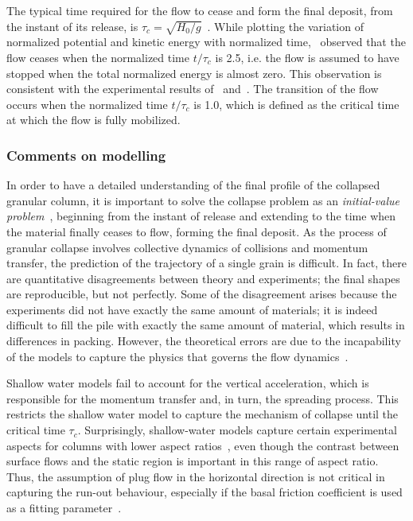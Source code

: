The typical time required for the flow to cease and form the final 
deposit, from the instant of its release, is 
$\tau_c=\sqrt{\textit{H}_{\textit{0}}/\textit{g}}$~\citep{Staron2007a}. 
While plotting the variation of normalized potential and kinetic energy with 
normalized time,~\citet{Staron2007a} observed that the flow ceases when the 
normalized time $\textit{t}/\tau_c$ is 2.5, i.e. the flow is assumed to 
have stopped when the total normalized energy is almost zero. This observation 
is consistent with the experimental results of~\citet{Lube2005} 
and~\citet{Lajeunesse2005}. The transition of the flow occurs when the 
normalized time $\textit{t}/\tau_c$ is 1.0, which is defined as the critical 
time at which the flow is fully mobilized.

\subsubsection{Comments on modelling}

In order to have a detailed understanding of the final profile of the collapsed 
granular column, it is important to solve the collapse problem as an 
\textit{initial-value problem}~\citep{Balmforth2005}, beginning from the 
instant of release and extending to the time when the material finally ceases 
to flow, forming the final deposit. As the process of granular collapse 
involves collective dynamics of collisions and momentum transfer, the 
prediction of the trajectory of a single grain is difficult. In fact, there are 
quantitative disagreements between theory and experiments; the final shapes are 
reproducible, but not perfectly. Some of the disagreement arises because the 
experiments did not have exactly the same amount of materials; it is indeed 
difficult to fill the pile with exactly the same amount of material, which 
results in differences in packing. However, the theoretical errors are due to 
the incapability of the models to capture the physics that governs the flow 
dynamics~\citep{Balmforth2005}. 

Shallow water models fail to account for the 
vertical acceleration, which is responsible for the momentum transfer and, in 
turn, the spreading process. This restricts the shallow water model to capture 
the mechanism of collapse until the critical time $\tau_{\textit{c}}$. 
Surprisingly, shallow-water models capture certain experimental aspects for 
columns with lower aspect 
ratios~\citep{Mangeney2010,Balmforth2005,Kerswell2005}, even though the 
contrast between surface flows and the static region is important in this range 
of aspect ratio. Thus, the assumption of plug flow in the horizontal direction 
is not critical in capturing the run-out behaviour, especially if the basal 
friction coefficient is used as a fitting parameter~\citep{Lajeunesse2005}. 

